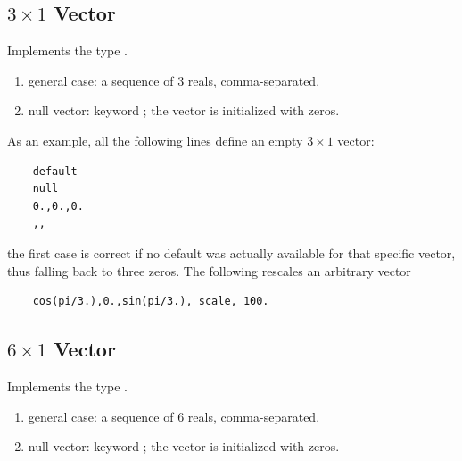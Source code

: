 \subsection{$3 \times 1$ Vector}
\label{sec:Vec3}
Implements the type .
\begin{enumerate}
    \item general case: a sequence of 3 reals, comma-separated.
    \item null vector: keyword ; the vector is initialized
	with zeros.
\end{enumerate}
As an example, all the following lines define an empty $3 \times 1$ vector:
\begin{verbatim}
    default
    null
    0.,0.,0.
    ,,
\end{verbatim}
the first case is correct if no default was actually available
for that specific vector, thus falling back to three zeros.
The following rescales an arbitrary vector
\begin{verbatim}
    cos(pi/3.),0.,sin(pi/3.), scale, 100.
\end{verbatim}

\subsection{$6 \times 1$ Vector}
\label{sec:Vec6}
Implements the type .
\begin{enumerate}
    \item general case: a sequence of 6 reals, comma-separated.
    \item null vector: keyword ; the vector is initialized 
    with zeros.	
\end{enumerate}
